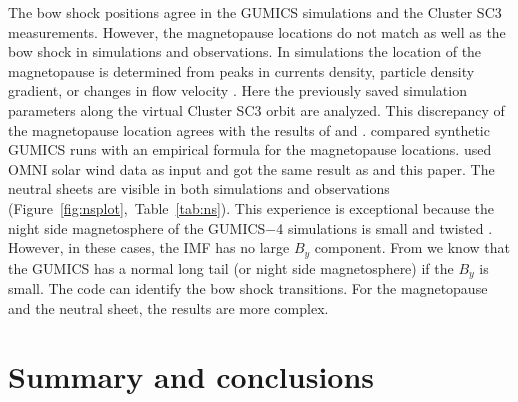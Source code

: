 \documentclass[b5paper,10pt]{article}
\begin{document}
The bow shock positions agree in the GUMICS simulations and the Cluster SC3 measurements. However, the magnetopause locations do not match as well as the bow shock in simulations and observations. In simulations the location of the magnetopause is determined from peaks in currents density, particle density gradient, or changes in flow velocity \citep[see references therein]{siscoe01:_magnet_fluop,garcia07:_findin_lyon_fedder_mobar,gordeev13:_verif_gumic_mhd}. Here the previously saved simulation parameters along the virtual Cluster SC3 orbit are analyzed. %
This discrepancy of the magnetopause location agrees with the results of \citep{gordeev13:_verif_gumic_mhd} and \citep{facsko16:_one_earth}. \citep{gordeev13:_verif_gumic_mhd} compared synthetic GUMICS runs with an empirical formula for the magnetopause locations. \citep{facsko16:_one_earth} used OMNI solar wind data as input and got the same result as \citep{gordeev13:_verif_gumic_mhd} and this paper. The neutral sheets are visible in both simulations and observations (Figure~\ref{fig:nsplot},~Table~\ref{tab:ns}). This experience is exceptional because the night side magnetosphere of the GUMICS$-$4 simulations is small and twisted \citep{gordeev13:_verif_gumic_mhd,facsko16:_one_earth}. However, in these cases, the IMF has no large $B_{y}$ component. From \citep{facsko16:_one_earth} we know that the GUMICS has a normal long tail (or night side magnetosphere) if the $B_{y}$ is small. The code can identify the bow shock transitions. For the magnetopause and the neutral sheet, the results are more complex.

\section{Summary and conclusions}
\label{sec:concl}
\end{document}
